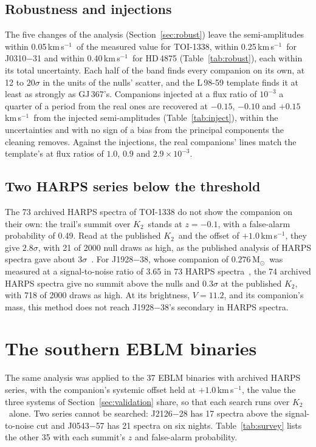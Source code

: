 \documentclass[3p,11pt]{elsarticle}
\newcommand{\kms}{km\,s$^{-1}$}
\newcommand{\Msun}{M$_\odot$}
\newcommand{\Ktwo}{$K_2$}
\begin{document}
\subsection{Robustness and injections}

The five changes of the analysis (Section~\ref{sec:robust}) leave the semi-amplitudes within
0.05\,\kms\ of the measured value for TOI-1338, within 0.25\,\kms\ for J0310$-$31 and within
0.40\,\kms\ for HD\,4875 (Table~\ref{tab:robust}), each within its total uncertainty. Each half of
the band finds every companion on its own, at 12 to $20\sigma$ in the units of the nulls' scatter,
and the L\,98-59 template finds it at least as strongly as GJ\,367's. Companions injected at a flux
ratio of $10^{-3}$ a quarter of a period from the real ones are recovered at $-0.15$, $-0.10$ and
$+0.15$\,\kms\ from the injected semi-amplitudes (Table~\ref{tab:inject}), within the
uncertainties and with no sign of a bias from the principal components the cleaning removes. Against the
injections, the real companions' lines match the template's at flux ratios of $1.0$, $0.9$ and
$2.9\times10^{-3}$.

\subsection{Two HARPS series below the threshold}

The 73 archived HARPS spectra of TOI-1338 do not show the companion on their own: the trail's
summit over \Ktwo\ stands at $z = -0.1$, with a false-alarm probability of 0.49. Read at the
published \Ktwo\ and the offset of $+1.0$\,\kms, they give $2.8\sigma$, with 21 of 2000 null draws
as high, as the published analysis of HARPS spectra gave about $3\sigma$~\cite{Sebastian2024b}. For
J1928$-$38, whose companion of $0.276$\,\Msun\ was measured at a signal-to-noise ratio of 3.65 in
73 HARPS spectra~\cite{Stevenson2026}, the 74 archived HARPS spectra give no summit above the nulls
and $0.3\sigma$ at the published \Ktwo, with 718 of 2000 draws as high. At its brightness, $V =
11.2$, and its companion's mass, this method does not reach J1928$-$38's secondary in HARPS
spectra.

\section{The southern EBLM binaries}\label{sec:survey}

The same analysis was applied to the 37 EBLM binaries with archived HARPS series, with the
companion's systemic offset held at $+1.0$\,\kms, the value the three systems of
Section~\ref{sec:validation} share, so that each search runs over \Ktwo\ alone. Two series cannot
be searched: J2126$-$28 has 17 spectra above the signal-to-noise cut and J0543$-$57 has 21 spectra
on six nights. Table~\ref{tab:survey} lists the other 35 with each summit's $z$ and false-alarm
probability.
\end{document}
